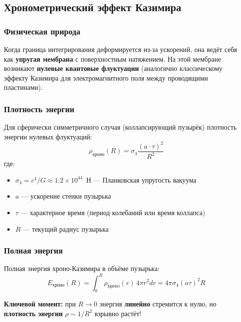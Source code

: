 \documentclass[12pt,a4paper]{article}
\begin{document}
\subsection{Хронометрический эффект Казимира}

\subsubsection{Физическая природа}

Когда граница интегрирования деформируется из-за ускорений, она ведёт себя как \textbf{упругая мембрана} с поверхностным натяжением. На этой мембране возникают \textbf{нулевые квантовые флуктуации} (аналогично классическому эффекту Казимира для электромагнитного поля между проводящими пластинами).

\subsubsection{Плотность энергии}

Для сферически симметричного случая (коллапсирующий пузырёк) плотность энергии нулевых флуктуаций:
\begin{equation}
\rho_{\text{хроно}}(R) = \sigma_4 \frac{(a \cdot \tau)^2}{R^2}
\label{eq:rho_chrono}
\end{equation}
где:
\begin{itemize}
    \item $\sigma_4 = c^4/G \approx 1.2 \times 10^{44}$~Н — Планковская упругость вакуума
    \item $a$ — ускорение стенки пузырька
    \item $\tau$ — характерное время (период колебаний или время коллапса)
    \item $R$ — текущий радиус пузырька
\end{itemize}

\subsubsection{Полная энергия}

Полная энергия хроно-Казимира в объёме пузырька:
\begin{equation}
E_{\text{хроно}}(R) = \int_0^R \rho_{\text{хроno}}(r) \, 4\pi r^2 dr = 4\pi \sigma_4 (a\tau)^2 R
\end{equation}

\textbf{Ключевой момент:} при $R \to 0$ энергия \textbf{линейно} стремится к нулю, но \textbf{плотность энергии} $\rho \sim 1/R^2$ взрывно растёт!
\end{document}
